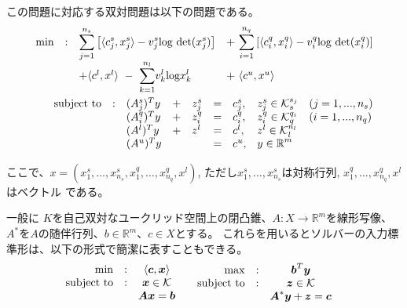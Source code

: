 \documentclass[11pt,a4paper,dvipdfmx,titlepage,uplatex]{jsarticle}
\theoremstyle{mystyle}
\newcommand{\modify}[2]{\begin{color}{red}\underline{#1}{#2}\end{color}}
\newcommand{\0}{\mathbf{0}}
\def\b{\mbox{\boldmath $b$}}
\def\c{\mbox{\boldmath $c$}}
\def\x{\mbox{\boldmath $x$}}
\def\y{\mbox{\boldmath $y$}}
\def\z{\mbox{\boldmath $z$}}
\def\A{\mbox{\boldmath $A$}}
\def\KC{\mbox{$\cal K$}}
\def\Real{\mbox{$\mathbb{R}$}}
\begin{document}
この問題に対応する双対問題は以下の問題である。
\begin{align}
  \begin{array}{rcll}
    \min & : & \displaystyle{\sum_{j=1}^{n_s}} \left[
    \langle c_j^s , x_j^s \rangle - v_j^s \text{log det}  (x_j^s)
     \right] & + \ \displaystyle{\sum_{i=1}^{n_q}} \left[
     \langle c_i^q , x_i^q \rangle - v_i^q \text{log det}  (x_i^q)
      \right] \\
      & & + \langle
      c^l , x^l
       \rangle \ - \ \displaystyle{\sum_{k=1}^{n_l}} v_k^l \text{log} x_k^l & + \ \langle
       c^u , x^u \rangle \\
  \end{array}\\
  \begin{array}{lllllllll}
    \text{subject to} & : & (A_j^s)^T y & + & z_j^s & = & c_j^s, & z_j^s \in \KC_s^{s_j} & (j = 1,...,n_s) \\
    & & (A_i^q)^T y & + & z_i^q & = & c_i^q, & z_i^q \in \KC_q^{q_i} & (i = 1,...,n_q) \\
    & & (A^l)^T y & + & z^l & = & c^l, & z^l \in \KC_l^{n_l} & \\
    & & (A^u)^T y &   &     & = &  c^u, & y \in \Real^m & \\
  \end{array}
\end{align}

ここで、$x = (x_1^s , \dots , x_{n_s}^s , x_1^q , \dots , x_{n_q}^q , x^l)$,
ただし$x_1^s , \dots , x_{n_s}^s$は対称行列,
$x_1^q , \dots , x_{n_q}^q , x^l$はベクトル
である。

一般に
$K$を自己双対なユークリッド空間上の閉凸錐、$A:X \to \Real^m$を線形写像、
$A^*$を$A$の随伴行列、$b \in \Real^m$、$c \in X$とする。
これらを用いるとソルバーの入力標準形は、以下の形式で簡潔に表すこともできる。
\begin{align}
	\label{eq:SDPT3-input}
  \begin{array}{rcc}
    \min & : & \langle \c , \x \rangle \\
    \text{subject to} & : & \x \in \KC \\
    & & \A \x = \b
  \end{array} & \quad
  \begin{array}{rcc}
    \max & : & \b^T \y \\
    \text{subject to} & : & \z \in \KC \\
    & & \A^* \y + \z = \c
  \end{array}
\end{align}
\end{document}
